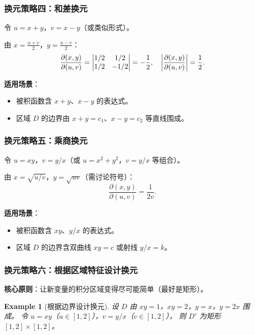 \documentclass{ctexart}
\newtheorem{example}[theorem]{Example}
\begin{document}
\subsubsection*{换元策略四：和差换元}

令 $u = x + y$，$v = x - y$（或类似形式）。

由 $x = \frac{u+v}{2}$，$y = \frac{u-v}{2}$：
\[
  \frac{\partial(x,y)}{\partial(u,v)}
  = \begin{vmatrix} 1/2 & 1/2 \\ 1/2 & -1/2 \end{vmatrix}
  = -\frac{1}{2}, \quad
  \left| \frac{\partial(x,y)}{\partial(u,v)} \right| = \frac{1}{2}.
\]

\textbf{适用场景}：
\begin{itemize}
  \item 被积函数含 $x+y$、$x-y$ 的表达式。
  \item 区域 $D$ 的边界由 $x+y = c_1$、$x-y = c_2$ 等直线围成。
\end{itemize}

\subsubsection*{换元策略五：乘商换元}

令 $u = xy$，$v = y/x$（或 $u = x^2+y^2$，$v = y/x$ 等组合）。

由 $x = \sqrt{u/v}$，$y = \sqrt{uv}$（需讨论符号）：
\[
  \frac{\partial(x,y)}{\partial(u,v)}
  = \frac{1}{2v}.
\]

\textbf{适用场景}：
\begin{itemize}
  \item 被积函数含 $xy$、$y/x$ 的表达式。
  \item 区域 $D$ 的边界含双曲线 $xy = c$ 或射线 $y/x = k$。
\end{itemize}

\subsubsection*{换元策略六：根据区域特征设计换元}

\textbf{核心原则}：让新变量的积分区域变得尽可能简单（最好是矩形）。

\begin{example}[根据边界设计换元]
  设 $D$ 由 $xy = 1$，$xy = 2$，$y = x$，$y = 2x$ 围成。
  令 $u = xy$（$u \in [1,2]$），$v = y/x$（$v \in [1,2]$），
  则 $D'$ 为矩形 $[1,2] \times [1,2]$。
\end{example}
\end{document}
